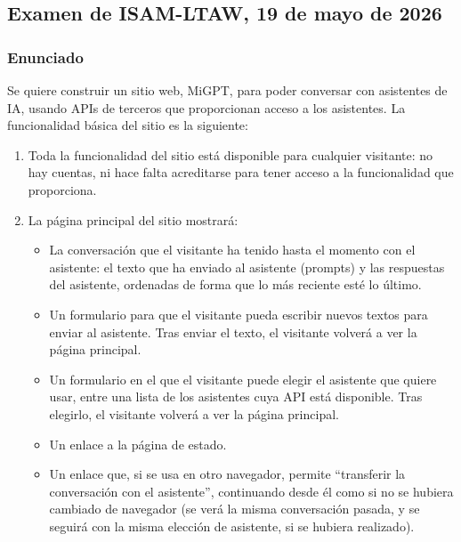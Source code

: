 
\subsection{Examen de ISAM-LTAW, 19 de mayo de 2026}

\subsubsection{Enunciado}

Se quiere construir un sitio web, MiGPT, para poder conversar con asistentes de IA, usando APIs de terceros que proporcionan acceso a los asistentes. La funcionalidad básica del sitio es la siguiente:

\begin{enumerate}
\item Toda la funcionalidad del sitio está disponible para cualquier visitante: no hay cuentas, ni hace falta acreditarse para tener acceso a la funcionalidad que proporciona.

\item La página principal del sitio mostrará:
  \begin{itemize}
  \item La conversación que el visitante ha tenido hasta el momento con el asistente: el texto que ha enviado al asistente (prompts) y las respuestas del asistente, ordenadas de forma que lo más reciente esté lo último.
  \item Un formulario para que el visitante pueda escribir nuevos textos para enviar al asistente. Tras enviar el texto, el visitante volverá a ver la página principal.
  \item Un formulario en el que el visitante puede elegir el asistente que quiere usar, entre una lista de los asistentes cuya API está disponible. Tras elegirlo, el visitante volverá a ver la página principal.
  \item Un enlace a la página de estado.
  \item Un enlace que, si se usa en otro navegador, permite ``transferir la conversación con el asistente'', continuando desde él como si no se hubiera cambiado de navegador (se verá la misma conversación pasada, y se seguirá con la misma elección de asistente, si se hubiera realizado).
  \end{itemize}


\end{enumerate}
